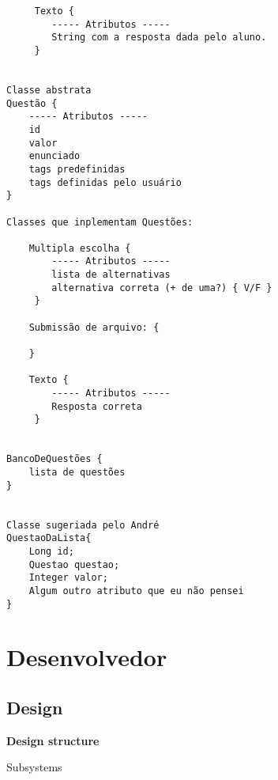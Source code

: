 \documentclass[12pt,letterpaper]{article}
\begin{document}
\begin{verbatim}
     Texto {
        ----- Atributos -----
        String com a resposta dada pelo aluno.
     }


Classe abstrata
Questão {
    ----- Atributos -----
    id 
    valor
    enunciado 
    tags predefinidas
    tags definidas pelo usuário
}
  
Classes que inplementam Questões:
 
    Multipla escolha {
        ----- Atributos -----
        lista de alternativas
        alternativa correta (+ de uma?) { V/F }
     }
              
    Submissão de arquivo: {
	
    }
              
    Texto {
        ----- Atributos -----
        Resposta correta
     }


BancoDeQuestões {
    lista de questões
}


Classe sugeriada pelo André
QuestaoDaLista{
    Long id;
    Questao questao;
    Integer valor;
    Algum outro atributo que eu não pensei
}
\end{verbatim}

\pagebreak
\section{Desenvolvedor}

\subsection{Design}

\vspace{1cm}
{\large {\bf Design structure}}
\vspace{0.5cm}




Subsystems




\end{document}
